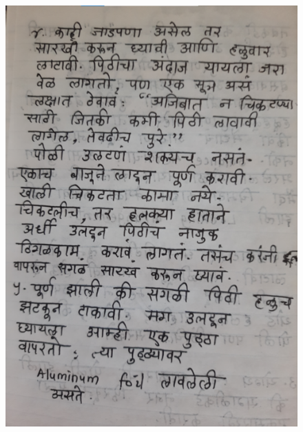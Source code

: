 \documentclass[17pt]{extarticle}  %
\begin{document}
\begin{figure}[h!]
    \centering
    \includegraphics{img/12-s.png}
\end{figure}
\end{document}
